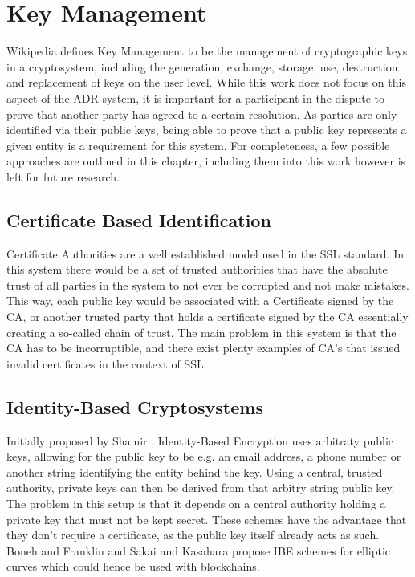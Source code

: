 \documentclass[12pt,msc,a4paper,oneside]{ucl_thesis}
\begin{document}
\chapter{Key Management} \label{chapter:key_management}
Wikipedia \cite{wiki:key_management} defines Key Management to be the management of cryptographic keys in a cryptosystem, including the generation, exchange, storage, use, destruction and replacement of keys on the user level. While this work does not focus on this aspect of the ADR system, it is important for a participant in the dispute to prove that another party has agreed to a certain resolution. As parties are only identified via their public keys, being able to prove that a public key represents a given entity is a requirement for this system. For completeness, a few possible approaches are outlined in this chapter, including them into this work however is left for future research.

\section{Certificate Based Identification}
Certificate Authorities are a well established model used in the SSL standard. In this system there would be a set of trusted authorities that have the absolute trust of all parties in the system to not ever be corrupted and not make mistakes. This way, each public key would be associated with a Certificate signed by the CA, or another trusted party that holds a certificate signed by the CA essentially creating a so-called chain of trust. The main problem in this system is that the CA has to be incorruptible, and there exist plenty examples of CA's that issued invalid certificates in the context of SSL.

\section{Identity-Based Cryptosystems}
Initially proposed by Shamir \cite{shamir1984identity}, Identity-Based Encryption uses arbitraty public keys, allowing for the public key to be e.g. an email address, a phone number or another string identifying the entity behind the key. Using a central, trusted authority, private keys can then be derived from that arbitry string public key. The problem in this setup is that it depends on a central authority holding a private key that must not be kept secret. These schemes have the advantage that they don't require a certificate, as the public key itself already acts as such. Boneh and Franklin \cite{boneh2001identity} and Sakai and Kasahara \cite{sakai2003id} propose IBE schemes for elliptic curves which could hence be used with blockchains.
\end{document}
